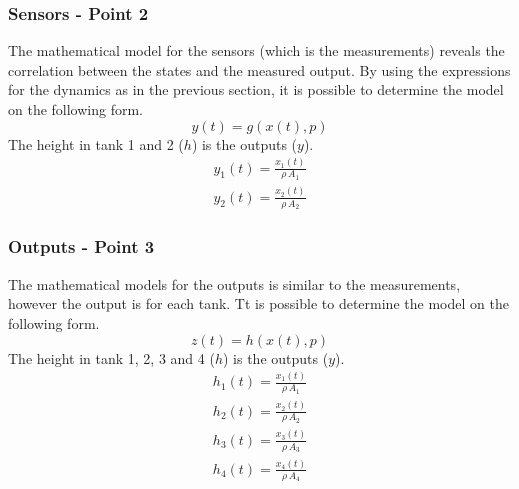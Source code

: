 \subsubsection{Sensors - Point 2}
The mathematical model for the sensors (which is the measurements) reveals the correlation between the states and the measured output. By using the expressions for the dynamics as in the previous section, it is possible to determine the model on the following form.
\begin{equation}
    y(t)=g(x(t),p)
\end{equation}
The height in tank 1 and 2 ($h$) is the outputs ($y$).
\begin{equation}
    \begin{gathered}
        y_1(t)=\frac{x_1(t)}{\rho\,A_1}\\
        y_2(t)=\frac{x_2(t)}{\rho\,A_2}
    \end{gathered}
\end{equation}

\subsubsection{Outputs - Point 3}
The mathematical models for the outputs is similar to the measurements, however the output is for each tank. Tt is possible to determine the model on the following form.
\begin{equation}
    z(t)=h(x(t),p)
\end{equation}
The height in tank 1, 2, 3 and 4 ($h$) is the outputs ($y$).
\begin{equation}
    \begin{gathered}
        h_1(t)=\frac{x_1(t)}{\rho\,A_1}\\
        h_2(t)=\frac{x_2(t)}{\rho\,A_2}\\
        h_3(t)=\frac{x_3(t)}{\rho\,A_3}\\
        h_4(t)=\frac{x_4(t)}{\rho\,A_4}
    \end{gathered}
\end{equation}